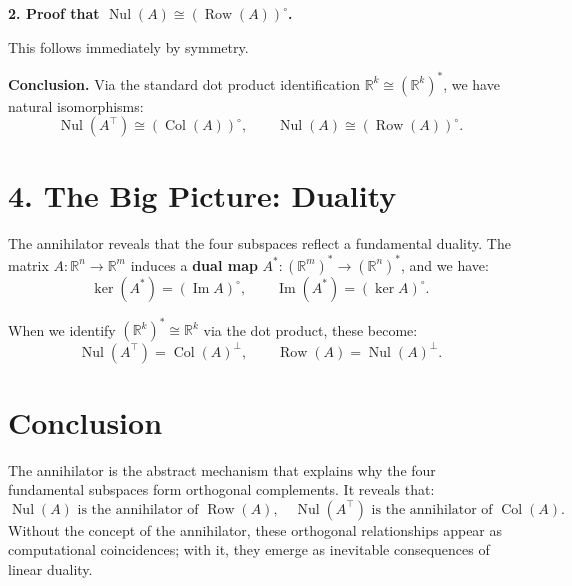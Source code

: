 \documentclass[11pt]{article}
\newcommand{\nul}{\operatorname{Nul}}
\newcommand{\col}{\operatorname{Col}}
\newcommand{\row}{\operatorname{Row}}
\begin{document}
\noindent\textbf{2. Proof that $\nul(A) \cong (\row(A))^\circ$.}

This follows immediately by symmetry.

\noindent\textbf{Conclusion.}  
Via the standard dot product identification $\mathbb{R}^k \cong (\mathbb{R}^k)^*$, we have natural isomorphisms:
\[
\boxed{\nul(A^\top) \cong (\col(A))^\circ}, \qquad
\boxed{\nul(A) \cong (\row(A))^\circ}.
\]





\section*{4. The Big Picture: Duality}

The annihilator reveals that the four subspaces reflect a fundamental duality.  
The matrix $ A: \mathbb{R}^n \to \mathbb{R}^m $ induces a \textbf{dual map} $ A^*: (\mathbb{R}^m)^* \to (\mathbb{R}^n)^* $, and we have:
\[
\ker(A^*) = (\operatorname{Im} A)^\circ, \qquad \operatorname{Im}(A^*) = (\ker A)^\circ.
\]

When we identify $ (\mathbb{R}^k)^* \cong \mathbb{R}^k $ via the dot product, these become:
\[
\operatorname{Nul}(A^\top) = \operatorname{Col}(A)^\perp, \qquad \operatorname{Row}(A) = \operatorname{Nul}(A)^\perp.
\]
\section*{Conclusion}

The annihilator is the abstract mechanism that explains why the four fundamental subspaces form orthogonal complements. It reveals that:
\[
\operatorname{Nul}(A) \text{ is the annihilator of } \operatorname{Row}(A), \quad
\operatorname{Nul}(A^\top) \text{ is the annihilator of } \operatorname{Col}(A).
\]
Without the concept of the annihilator, these orthogonal relationships appear as computational coincidences; with it, they emerge as inevitable consequences of linear duality.
\end{document}
